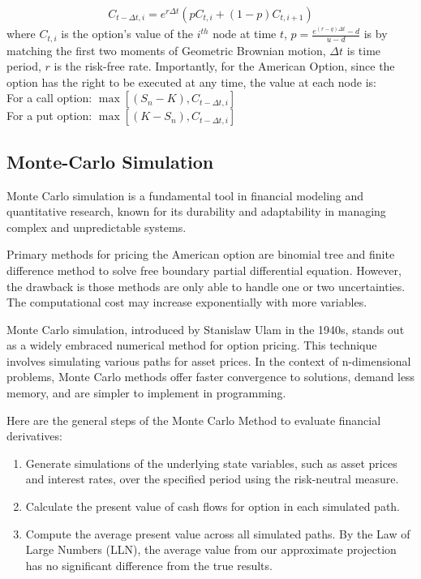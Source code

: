 \documentclass{article}
\begin{document}
\begin{enumerate}
    \begin{align*}
        C_{t-\Delta t,i} = e^{r\Delta t}(p C_{t,i} + (1 - p)C_{t,i+1})
    \end{align*}
    where $C_{t,i}$ is the option's value of the $i^{th}$ node at time $t$, $p = \frac{e^{(r-q)\Delta t} - d}{u - d}$ is by matching the first two moments of Geometric Brownian motion, $\Delta t$ is time period, $r$ is the risk-free rate. Importantly, for the American Option, since the option has the right to be executed at any time, the value at each node is:\\
    For a call option: $\max\left[(S_n - K), C_{t-\Delta t,i}\right]$ \\
    For a put option: $\max\left[(K - S_n), C_{t-\Delta t,i}\right]$

    
\end{enumerate}

\subsection{Monte-Carlo Simulation}

Monte Carlo simulation is a fundamental tool in financial modeling and quantitative research, known for its durability and adaptability in managing complex and unpredictable systems. 

Primary methods for pricing the American option are binomial tree and finite difference method to solve free boundary partial differential equation. However, the drawback is those methods are only able to handle one or two uncertainties. The computational cost may increase exponentially with more variables. 

Monte Carlo simulation, introduced by Stanislaw Ulam in the 1940s, stands out as a widely embraced numerical method for option pricing. This technique involves simulating various paths for asset prices. In the context of n-dimensional problems, Monte Carlo methods offer faster convergence to solutions, demand less memory, and are simpler to implement in programming.

Here are the general steps of the Monte Carlo Method  to evaluate financial derivatives:
\begin{enumerate}
    \item Generate simulations of the underlying state variables, such as asset prices and interest rates, over the specified period using the risk-neutral measure.
    \item Calculate the present value of cash flows for option in each simulated path.
    \item Compute the average present value across all simulated paths. By the Law of Large Numbers (LLN), the average value from our approximate projection has no significant difference from the true results.
\end{enumerate}
\end{document}
